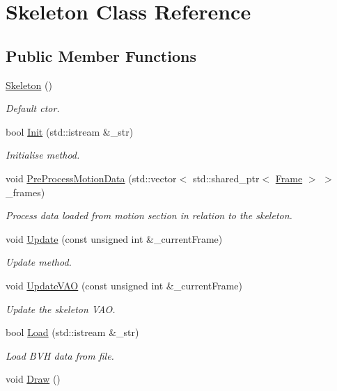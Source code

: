\hypertarget{class_skeleton}{}\section{Skeleton Class Reference}
\label{class_skeleton}
\subsection*{Public Member Functions}
\begin{DoxyCompactItemize}
\item 
\hyperlink{class_skeleton_af01a02f1ce9ae4c801cd6e66ccf7407f}{Skeleton} ()\hypertarget{class_skeleton_af01a02f1ce9ae4c801cd6e66ccf7407f}{}\label{class_skeleton_af01a02f1ce9ae4c801cd6e66ccf7407f}

\begin{DoxyCompactList}\small\item\em Default ctor. \end{DoxyCompactList}\item 
bool \hyperlink{class_skeleton_ace814d0861f07ead8c64ed5fb47ff1bd}{Init} (std\+::istream \&\+\_\+str)
\begin{DoxyCompactList}\small\item\em Initialise method. \end{DoxyCompactList}\item 
void \hyperlink{class_skeleton_ab22b3932632e4e6a0eaca71403161186}{Pre\+Process\+Motion\+Data} (std\+::vector$<$ std\+::shared\+\_\+ptr$<$ \hyperlink{class_frame}{Frame} $>$ $>$ \+\_\+frames)
\begin{DoxyCompactList}\small\item\em Process data loaded from motion section in relation to the skeleton. \end{DoxyCompactList}\item 
void \hyperlink{class_skeleton_a4a23dfa92a6e3ad0d8e8ac8d003e2100}{Update} (const unsigned int \&\+\_\+current\+Frame)
\begin{DoxyCompactList}\small\item\em Update method. \end{DoxyCompactList}\item 
void \hyperlink{class_skeleton_ad26c45243ff907c4f383e1e8f144be44}{Update\+V\+AO} (const unsigned int \&\+\_\+current\+Frame)
\begin{DoxyCompactList}\small\item\em Update the skeleton V\+AO. \end{DoxyCompactList}\item 
bool \hyperlink{class_skeleton_ae41174e6b1a767f0cf7f6b5a5d0ddf03}{Load} (std\+::istream \&\+\_\+str)
\begin{DoxyCompactList}\small\item\em Load B\+VH data from file. \end{DoxyCompactList}\item 
void \hyperlink{class_skeleton_a9ccd597aa1ab7e0c2a01d52b01ff5261}{Draw} ()\hypertarget{class_skeleton_a9ccd597aa1ab7e0c2a01d52b01ff5261}{}\label{class_skeleton_a9ccd597aa1ab7e0c2a01d52b01ff5261}


\end{DoxyCompactItemize}
